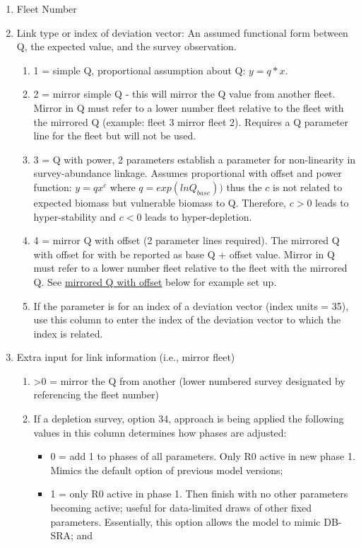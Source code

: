 \begin{enumerate}
	\item Fleet Number
	\item Link type or index of deviation vector: An assumed functional form between Q, the expected value, and the survey observation.
	\begin{enumerate}
		\item 1 = simple Q, proportional assumption about Q: $y=q*x$.
		\item 2 = mirror simple Q - this will mirror the Q value from another fleet. Mirror in Q must refer to a lower number fleet relative to the fleet with the mirrored Q (example: fleet 3 mirror fleet 2). Requires a Q parameter line for the fleet but will not be used.
		\item 3 = Q with power, 2 parameters establish a parameter for non-linearity in survey-abundance linkage. Assumes proportional with offset and power function: $y=qx^c$ where $q = exp(lnQ_{base}))$ thus the $c$ is not related to expected biomass but vulnerable biomass to Q. Therefore, $c > 0$ leads to hyper-stability and $c < 0$ leads to hyper-depletion.
		\item 4 = mirror Q with offset (2 parameter lines required). The mirrored Q with offset for with be reported as base Q + offset value. Mirror in Q must refer to a lower number fleet relative to the fleet with the mirrored Q. See \hyperlink{MirrorQoffset}{mirrored Q with offset} below for example set up.
		\item If the parameter is for an index of a deviation vector (index units = 35), use this column to enter the index of the deviation vector to which the index is related.
	\end{enumerate}
	\item \hypertarget{link_info}{Extra input for link information (i.e., mirror fleet)}
	\begin{enumerate}
		\item >0 = mirror the Q from another (lower numbered survey designated by referencing the fleet number)
		\item If a depletion survey, option 34, approach is being applied the following values in this column determines how phases are adjusted:
		\begin{itemize}
			\item 0 = add 1 to phases of all parameters. Only R0 active in new phase 1. Mimics the default option of previous model versions;
			\item 1 = only R0 active in phase 1. Then finish with no other parameters becoming active; useful for data-limited draws of other fixed parameters. Essentially, this option allows the model to mimic DB-SRA; and

\end{itemize}
\end{enumerate}
\end{enumerate}
